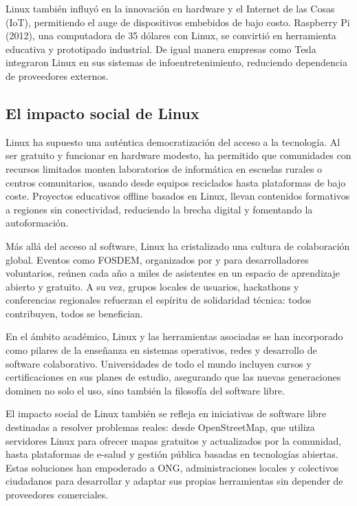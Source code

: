 \documentclass[a4paper,12pt]{article}
\begin{document}
Linux también influyó en la innovación en hardware y el Internet de las Cosas
(IoT), permitiendo el auge de dispositivos embebidos de bajo costo. Raspberry Pi
(2012), una computadora de 35 dólares con Linux, se convirtió en herramienta
educativa y prototipado industrial. De igual manera empresas como Tesla
integraron Linux en sus sistemas de infoentretenimiento, reduciendo dependencia
de proveedores externos. 

\subsection{El impacto social de Linux}

Linux ha supuesto una auténtica democratización del acceso a la tecnología. Al
ser gratuito y funcionar en hardware modesto, ha permitido que comunidades con
recursos limitados monten laboratorios de informática en escuelas rurales o
centros comunitarios, usando desde equipos reciclados hasta plataformas de bajo
coste. Proyectos educativos offline basados en Linux, llevan contenidos
formativos a regiones sin conectividad, reduciendo la brecha digital y 
fomentando la autoformación.

Más allá del acceso al software, Linux ha cristalizado una cultura de
colaboración global.  Eventos como FOSDEM, organizados por y para
desarrolladores voluntarios, reúnen cada año a miles de asistentes en un espacio
de aprendizaje abierto y gratuito. A su vez, grupos locales de usuarios,
hackathons y conferencias regionales refuerzan el espíritu de solidaridad
técnica: todos contribuyen, todos se benefician.

En el ámbito académico, Linux y las herramientas asociadas se han incorporado
como pilares de la enseñanza en sistemas operativos, redes y desarrollo de
software colaborativo. Universidades de todo el mundo incluyen cursos y
certificaciones en sus planes de estudio, asegurando que las nuevas generaciones
dominen no solo el uso, sino también la filosofía del software libre.

El impacto social de Linux también se refleja en iniciativas de software libre
destinadas a resolver problemas reales: desde OpenStreetMap, que utiliza
servidores Linux para ofrecer mapas gratuitos y actualizados por la comunidad,
hasta plataformas de e-salud y gestión pública basadas en tecnologías abiertas.
Estas soluciones han empoderado a ONG, administraciones locales y colectivos 
ciudadanos para desarrollar y adaptar sus propias herramientas sin depender de
proveedores comerciales.
\end{document}
